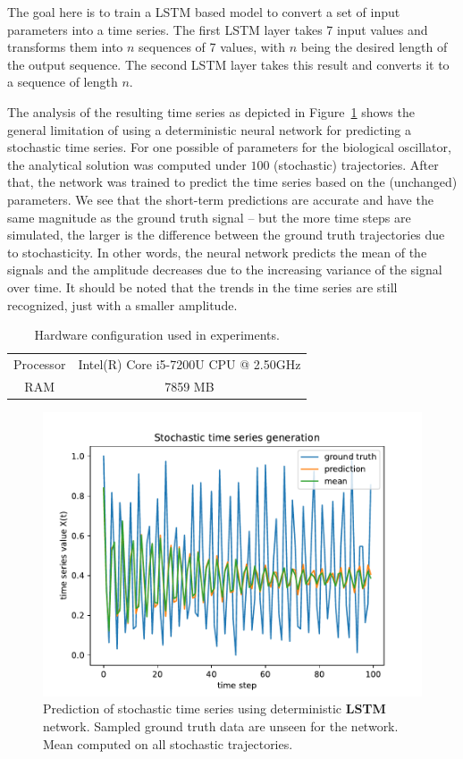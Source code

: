 \documentclass{article}
\begin{document}
The goal here is to train a LSTM based
model to convert a set of input parameters into a time series. The first
LSTM layer
takes 7 input values and transforms them into $n$ sequences of 7 values, with
$n$ being the desired length of the output sequence. The second LSTM layer
takes this result and converts it to a sequence of length $n$.

The analysis of the resulting time series as depicted in
Figure~\ref{fig:nn_limitation} shows the general limitation of using a
deterministic neural network for predicting a stochastic time series. For one
possible of parameters for the biological oscillator, the analytical solution
was computed under $100$ (stochastic) trajectories. After that, the network was
trained to predict the time series based on the (unchanged) parameters. We see
that the short-term predictions are accurate and have the same magnitude as the
ground truth signal -- but the more time steps are simulated, the larger is the
difference between the ground truth trajectories due to stochasticity. In other
words, the neural network predicts the mean of the signals and the amplitude
decreases due to the increasing variance of the signal over time.
It should be noted that the trends in the time series are still
recognized, just with a smaller amplitude.

\begin{table}
    \centering
    \begin{tabular}{cc}
        Processor & Intel(R) Core i5-7200U CPU @ 2.50GHz \\
        RAM       & 7859 MB                              \\
    \end{tabular}
    \caption{Hardware configuration used in experiments.}
    \label{tab:hardware}
\end{table}

\begin{figure}
    \centering
    \includegraphics[width=\textwidth]{figures/nn_limitation.pdf}
    \caption{Prediction of stochastic time series using deterministic
        \textbf{LSTM} network. Sampled ground truth data are unseen for the network.
        Mean computed on all stochastic trajectories.}
    \label{fig:nn_limitation}
\end{figure}





\end{document}
